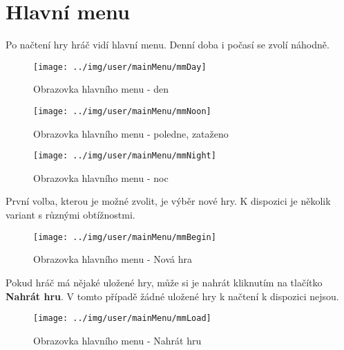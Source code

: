 
\section{Hlavní menu}

Po načtení hry hráč vidí hlavní menu. Denní doba i počasí se zvolí náhodně.

\begin{figure}[!ht]\centering
\texttt{[image: ../img/user/mainMenu/mmDay]}

\caption{Obrazovka hlavního menu - den}
\label{fig:user_mainMenu_mmDay}

\end{figure}

\begin{figure}[!ht]\centering
\texttt{[image: ../img/user/mainMenu/mmNoon]}

\caption{Obrazovka hlavního menu - poledne, zataženo}
\label{fig:user_mainMenu_mmNoon}

\end{figure}

\begin{figure}[!ht]\centering
\texttt{[image: ../img/user/mainMenu/mmNight]}

\caption{Obrazovka hlavního menu - noc}
\label{fig:user_mainMenu_mmNight}

\end{figure}



\FloatBarrier

První volba, kterou je možné zvolit, je výběr nové hry. K dispozici je několik variant s různými obtížnostmi.

\begin{figure}[!ht]\centering
\texttt{[image: ../img/user/mainMenu/mmBegin]}

\caption{Obrazovka hlavního menu - Nová hra}
\label{fig:user_mainMenu_mmBegin}

\end{figure}
\FloatBarrier

Pokud hráč má nějaké uložené hry, může si je nahrát kliknutím na tlačítko \textbf{Nahrát hru}. V tomto případě žádné uložené hry k načtení k dispozici nejsou.

\begin{figure}[!ht]\centering
\texttt{[image: ../img/user/mainMenu/mmLoad]}

\caption{Obrazovka hlavního menu - Nahrát hru}
\label{fig:user_mainMenu_mmLoad}

\end{figure}
\FloatBarrier

